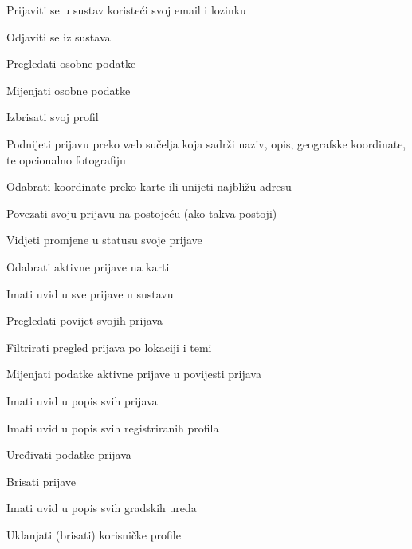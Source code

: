			
			\begin{packed_enum}
				\item  {}
				
				\begin{packed_enum}
					
					\item Prijaviti se u sustav koristeći svoj email i lozinku
					\item Odjaviti se iz sustava
					\item Pregledati osobne podatke
					\item Mijenjati osobne podatke
					\item Izbrisati svoj profil
					\item Podnijeti prijavu preko web sučelja koja sadrži naziv, opis, geografske koordinate, te opcionalno fotografiju
					\item Odabrati koordinate preko karte ili unijeti najbližu adresu
					\item Povezati svoju prijavu na postojeću (ako takva postoji)
					\item Vidjeti promjene u statusu svoje prijave
					\item Odabrati aktivne prijave na karti
					\item Imati uvid u sve prijave u sustavu
					\item Pregledati povijet svojih prijava
					\item Filtrirati pregled prijava po lokaciji i temi
					\item Mijenjati podatke aktivne prijave u povijesti prijava
				\end{packed_enum}
				
				\pagebreak
			
				\item  {}
				
				\begin{packed_enum}
					
					\item Imati uvid u popis svih prijava
					\item Imati uvid u popis svih registriranih profila
					\item Uređivati podatke prijava
					\item Brisati prijave
					\item Imati uvid u popis svih gradskih ureda
					\item Uklanjati (brisati) korisničke profile
				\end{packed_enum}
				

\end{packed_enum}
